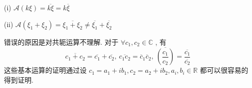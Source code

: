 \documentclass[11pt,a4paper,openany,oneside]{book}
\begin{document}
\hspace{0.5em} (i)  $ \mathcal{A}(k\xi) = \overline{k\xi} = k\overline{\xi} $ 

\hspace{0.5em} (ii)  $ \mathcal{A}(\xi_1 + \xi_2) = \overline{\xi_1 + \xi_2} \neq \overline{\xi_1} + \overline{\xi_2} $ 

\hspace{0.5em} 错误的原因是对共轭运算不理解. 对于 $ \forall c_1, c_2 \in \mathbb{C} $ , 有
 $$  \overline{c_1 + c_2} = \overline{c_1} + \overline{c_2}, \ \overline{c_1c_2} = \overline{c}_1 \overline{c}_2,\ \overline{\left(\dfrac{c_1}{c_2}\right)} = \dfrac{\overline{c_1}}{\overline{c_2}}  $$ 
\hspace{0.5em} 这些基本运算的证明通过设 $ c_1=a_1 + ib_1, c_2 = a_2 + ib_2, a_i,b_i \in \mathbb{R} $ 都可以很容易的得到证明.  \\ 
\end{document}
